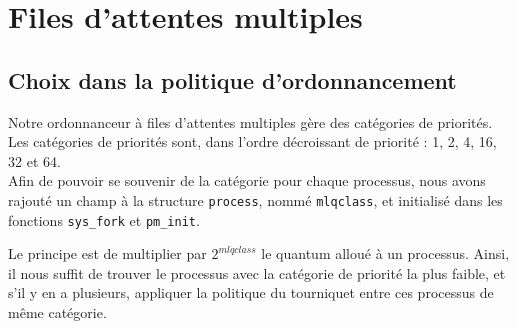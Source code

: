 \section{Files d'attentes multiples}

\subsection{Choix dans la politique d'ordonnancement}

Notre ordonnanceur à files d'attentes multiples gère des catégories de priorités.
Les catégories de priorités sont, dans l'ordre décroissant de priorité : 1, 2, 4, 16, 32 et 64.
\\

Afin de pouvoir se souvenir de la catégorie pour chaque processus, nous avons rajouté un champ à la structure \texttt{process}, nommé \texttt{mlqclass}, et initialisé dans les fonctions \texttt{sys\_fork} et \texttt{pm\_init}.

Le principe est de multiplier par $2^{mlqclass}$ le quantum alloué à un processus.
Ainsi, il nous suffit de trouver le processus avec la catégorie de priorité la plus faible, et s'il y en a plusieurs, appliquer la politique du tourniquet entre ces processus de même catégorie.

